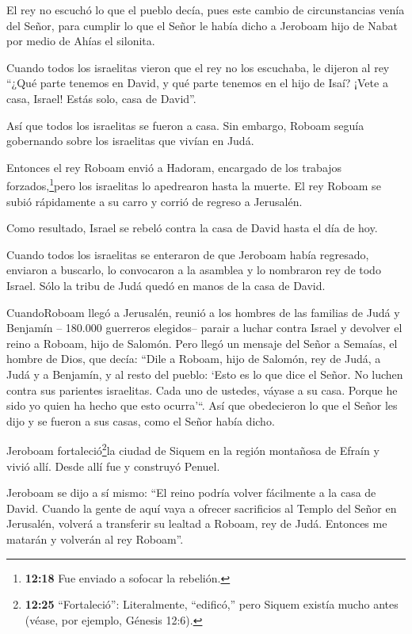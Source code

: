  El rey no escuchó lo que el pueblo decía, pues este cambio
de circunstancias venía del Señor, para cumplir lo que el Señor le había
dicho a Jeroboam hijo de Nabat por medio de Ahías el silonita.

 Cuando todos los israelitas vieron que el rey no los
escuchaba, le dijeron al rey ``¿Qué parte tenemos en David, y qué parte
tenemos en el hijo de Isaí? ¡Vete a casa, Israel! Estás solo, casa de
David''.

Así que todos los israelitas se fueron a casa.  Sin
embargo, Roboam seguía gobernando sobre los israelitas que vivían en
Judá.

 Entonces el rey Roboam envió a Hadoram, encargado de los
trabajos forzados,\footnote{\textbf{12:18} Fue enviado a sofocar la
  rebelión.}pero los israelitas lo apedrearon hasta la muerte. El rey
Roboam se subió rápidamente a su carro y corrió de regreso a Jerusalén.

 Como resultado, Israel se rebeló contra la casa de David
hasta el día de hoy.

 Cuando todos los israelitas se enteraron de que Jeroboam
había regresado, enviaron a buscarlo, lo convocaron a la asamblea y lo
nombraron rey de todo Israel. Sólo la tribu de Judá quedó en manos de la
casa de David.

 CuandoRoboam llegó a Jerusalén, reunió a los hombres de
las familias de Judá y Benjamín -- 180.000 guerreros elegidos-- parair a
luchar contra Israel y devolver el reino a Roboam, hijo de Salomón.
 Pero llegó un mensaje del Señor a Semaías, el hombre de
Dios, que decía:  ``Dile a Roboam, hijo de Salomón, rey de
Judá, a Judá y a Benjamín, y al resto del pueblo:  `Esto es
lo que dice el Señor. No luchen contra sus parientes israelitas. Cada
uno de ustedes, váyase a su casa. Porque he sido yo quien ha hecho que
esto ocurra'``. Así que obedecieron lo que el Señor les dijo y se fueron
a sus casas, como el Señor había dicho.

 Jeroboam fortaleció\footnote{\textbf{12:25}
  ``Fortaleció'': Literalmente, ``edificó,'' pero Siquem existía mucho
  antes (véase, por ejemplo, Génesis 12:6).}la ciudad de Siquem en la
región montañosa de Efraín y vivió allí. Desde allí fue y construyó
Penuel.

 Jeroboam se dijo a sí mismo: ``El reino podría volver
fácilmente a la casa de David.  Cuando la gente de aquí
vaya a ofrecer sacrificios al Templo del Señor en Jerusalén, volverá a
transferir su lealtad a Roboam, rey de Judá. Entonces me matarán y
volverán al rey Roboam''.


